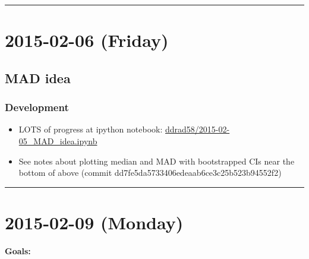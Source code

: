 \documentclass[letterpaper]{scrartcl}
\begin{document}
\begin{center}\rule{0.5\linewidth}{\linethickness}\end{center}

\section{2015-02-06 (Friday)}\label{friday}

\subsection{MAD idea}\label{mad-idea-1}

\subsubsection{Development}\label{development-1}

\begin{itemize}
\item
  LOTS of progress at ipython notebook:
  \href{file:///home/gus/Dropbox/common/ipy_notebooks/YALE/ddrad58/2015-02-05_MAD_idea.ipynb}{ddrad58/2015-02-05\_MAD\_idea.ipynb}
\item
  See notes about plotting median and MAD with bootstrapped CIs near the
  bottom of above (commit dd7fe5da5733406edeaab6ce3c25b523b94552f2)
\end{itemize}

\begin{center}\rule{0.5\linewidth}{\linethickness}\end{center}

\section{2015-02-09 (Monday)}\label{monday-1}

\textbf{Goals:}
\end{document}
